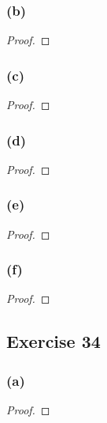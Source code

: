 \documentclass[14pt]{extarticle}
\begin{document}
\subsubsection{(b)}

\begin{proof}

\end{proof}

\subsubsection{(c)}

\begin{proof}

\end{proof}

\subsubsection{(d)}

\begin{proof}

\end{proof}

\subsubsection{(e)}

\begin{proof}

\end{proof}

\subsubsection{(f)}

\begin{proof}

\end{proof}

\subsection{Exercise 34}

\subsubsection{(a)}

\begin{proof}

\end{proof}
\end{document}
